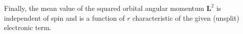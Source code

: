 Finally, the mean value of the squared orbital angular momentum $\mathbf L^2$ is independent of spin and is a function of $r$ characteristic of the given (unsplit) electronic term.
